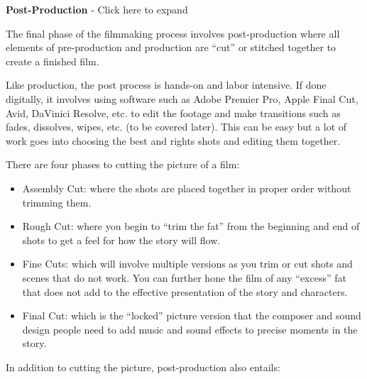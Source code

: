 \documentclass[
]{book}
\providecommand{\tightlist}{%
  \setlength{\itemsep}{0pt}\setlength{\parskip}{0pt}}
\begin{document}
\textbf{Post-Production} - Click here to expand

The final phase of the filmmaking process involves post-production where all elements of pre-production and production are ``cut'' or stitched together to create a finished film.

Like production, the post process is hands-on and labor intensive. If done digitally, it involves using software such as Adobe Premier Pro, Apple Final Cut, Avid, DaVinici Resolve, etc. to edit the footage and make transitions such as fades, dissolves, wipes, etc. (to be covered later). This can be easy but a lot of work goes into choosing the best and rights shots and editing them together.

There are four phases to cutting the picture of a film:

\begin{itemize}
\tightlist
\item
  Assembly Cut: where the shots are placed together in proper order without trimming them.\\
\item
  Rough Cut: where you begin to ``trim the fat'' from the beginning and end of shots to get a feel for how the story will flow.\\
\item
  Fine Cuts: which will involve multiple versions as you trim or cut shots and scenes that do not work. You can further hone the film of any ``excess'' fat that does not add to the effective presentation of the story and characters.\\
\item
  Final Cut: which is the ``locked'' picture version that the composer and sound design people need to add music and sound effects to precise moments in the story.
\end{itemize}

In addition to cutting the picture, post-production also entails:
\end{document}
